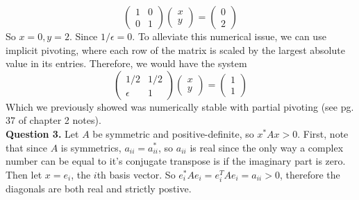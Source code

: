 \documentclass{article}
\begin{document}
\begin{equation*}
    \begin{pmatrix}
        1&0\\
        0&1
    \end{pmatrix}\begin{pmatrix}
        x\\y
    \end{pmatrix}=
    \begin{pmatrix}
        0\\2
    \end{pmatrix}
\end{equation*}
So $x=0, y=2$. Since $1/\epsilon = 0$. To alleviate this numerical issue, we can use implicit pivoting, where each row of the matrix is scaled by the largest absolute value in its entries. Therefore, we would have the system 
\begin{equation*}
    \begin{pmatrix}
        1/2 & 1/2\\
        \epsilon & 1
    \end{pmatrix}\begin{pmatrix}
        x\\y
    \end{pmatrix}=
    \begin{pmatrix}
        1\\ 1
    \end{pmatrix}
\end{equation*}
Which we previously showed was numerically stable with partial pivoting (see pg. 37 of chapter 2 notes).\\

\textbf{Question 3.} Let $A$ be symmetric and positive-definite, so $x^*Ax > 0$. First, note that since $A$ is symmetrics, $a_{ii}=a_{ii}^*$, so $a_{ii}$ is real since the only way a complex number can be equal to it's conjugate transpose is if the imaginary part is zero. Then let $x=e_i$, the $i$th basis vector. So $e_i^* A e_i = e_i^T A e_i = a_{ii} > 0$, therefore the diagonals are both real and strictly postive. 
\end{document}
